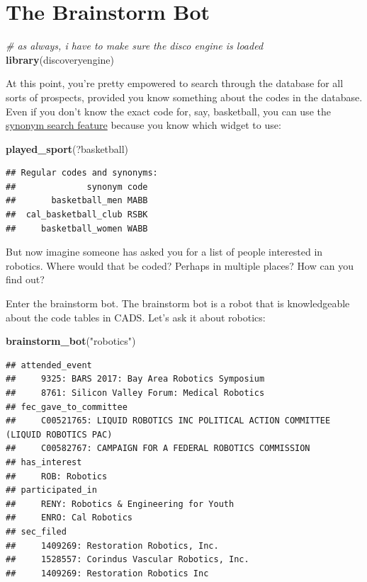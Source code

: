 \documentclass[]{book}
\newenvironment{Shaded}{\begin{snugshade}}{\end{snugshade}}
\newcommand{\CommentTok}[1]{\textcolor[rgb]{0.56,0.35,0.01}{\textit{#1}}}
\newcommand{\KeywordTok}[1]{\textcolor[rgb]{0.13,0.29,0.53}{\textbf{#1}}}
\newcommand{\NormalTok}[1]{#1}
\newcommand{\StringTok}[1]{\textcolor[rgb]{0.31,0.60,0.02}{#1}}
\begin{document}
\hypertarget{brainstorm-bot}{%
\chapter{The Brainstorm Bot}\label{brainstorm-bot}}

\begin{Shaded}
\begin{Highlighting}[]
\CommentTok{# as always, i have to make sure the disco engine is loaded}
\KeywordTok{library}\NormalTok{(discoveryengine)}
\end{Highlighting}
\end{Shaded}

At this point, you're pretty empowered to search through the database for all sorts of prospects, provided you know something about the codes in the database. Even if you don't know the exact code for, say, basketball, you can use the
\protect\hyperlink{synonym-search}{synonym search feature} because you know which widget to use:

\begin{Shaded}
\begin{Highlighting}[]
\KeywordTok{played_sport}\NormalTok{(?basketball)}
\end{Highlighting}
\end{Shaded}

\begin{verbatim}
## Regular codes and synonyms:
##              synonym code
##       basketball_men MABB
##  cal_basketball_club RSBK
##     basketball_women WABB
\end{verbatim}

But now imagine someone has asked you for a list of people interested in robotics. Where would that be coded? Perhaps in multiple places? How can you find out?

Enter the brainstorm bot. The brainstorm bot is a robot that is knowledgeable about the code tables in CADS. Let's ask it about robotics:

\begin{Shaded}
\begin{Highlighting}[]
\KeywordTok{brainstorm_bot}\NormalTok{(}\StringTok{"robotics"}\NormalTok{)}
\end{Highlighting}
\end{Shaded}

\begin{verbatim}
## attended_event 
##     9325: BARS 2017: Bay Area Robotics Symposium
##     8761: Silicon Valley Forum: Medical Robotics
## fec_gave_to_committee 
##     C00521765: LIQUID ROBOTICS INC POLITICAL ACTION COMMITTEE (LIQUID ROBOTICS PAC)
##     C00582767: CAMPAIGN FOR A FEDERAL ROBOTICS COMMISSION
## has_interest 
##     ROB: Robotics
## participated_in 
##     RENY: Robotics & Engineering for Youth
##     ENRO: Cal Robotics
## sec_filed 
##     1409269: Restoration Robotics, Inc.
##     1528557: Corindus Vascular Robotics, Inc.
##     1409269: Restoration Robotics Inc
\end{verbatim}
\end{document}
